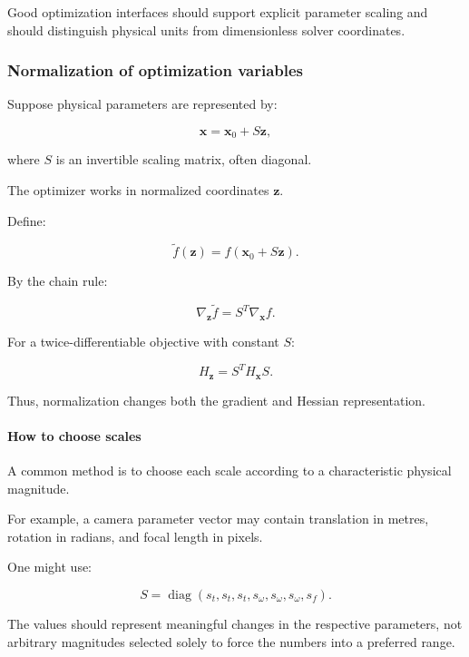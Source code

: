 Good optimization interfaces should support explicit parameter scaling and should distinguish physical units from dimensionless solver coordinates.

\subsubsection{Normalization of optimization variables}\label{02-foundations-ii-ch027-normalization-of-optimization-variables}

\hypertarget{02-foundations-ii-ch027-normalization-of-optimization-variables}{}

Suppose physical parameters are represented by:

\[
\mathbf x=\mathbf x_0+S\mathbf z,
\]

where \(S\) is an invertible scaling matrix, often diagonal.

The optimizer works in normalized coordinates \(\mathbf z\).

Define:

\[
\tilde f(\mathbf z)=f(\mathbf x_0+S\mathbf z).
\]

By the chain rule:

\[
\boxed{ \nabla_{\mathbf z}\tilde f = S^T\nabla_{\mathbf x}f }.
\]

For a twice-differentiable objective with constant \(S\):

\[
\boxed{ H_{\mathbf z}=S^TH_{\mathbf x}S }.
\]

Thus, normalization changes both the gradient and Hessian representation.

\paragraph{How to choose scales}\label{02-foundations-ii-ch027-how-to-choose-scales}

\hypertarget{02-foundations-ii-ch027-how-to-choose-scales}{}

A common method is to choose each scale according to a characteristic physical magnitude.

For example, a camera parameter vector may contain translation in metres, rotation in radians, and focal length in pixels.

One might use:

\[
S= \operatorname{diag} (s_t,s_t,s_t,s_\omega,s_\omega,s_\omega,s_f).
\]

The values should represent meaningful changes in the respective parameters, not arbitrary magnitudes selected solely to force the numbers into a preferred range.

